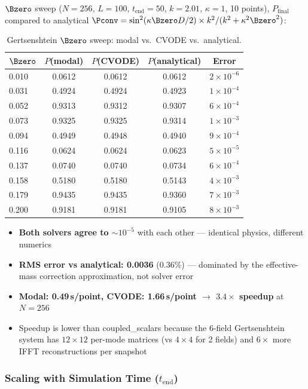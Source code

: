 $\Bzero$ sweep ($N=256$, $L=100$, $t_\text{end}=50$, $k=2.01$, $\kappa=1$, 10 points), $P_\text{final}$ compared to analytical $\Pconv = \sin^2(\kappa \Bzero D/2) \times k^2/(k^2 + \kappa^2 \Bzero^2)$:

\begin{table}[htbp]
\centering
\caption{Gertsenshtein $\Bzero$ sweep: modal vs.\ CVODE vs.\ analytical.}
\label{tab:modal-gertsenshtein}
\begin{tabular}{@{}lcccc@{}}
\toprule
$\Bzero$ & $P$(modal) & $P$(CVODE) & $P$(analytical) & Error \\
\midrule
0.010 & 0.0612 & 0.0612 & 0.0612 & $2\times 10^{-6}$ \\
0.031 & 0.4924 & 0.4924 & 0.4923 & $1\times 10^{-4}$ \\
0.052 & 0.9313 & 0.9312 & 0.9307 & $6\times 10^{-4}$ \\
0.073 & 0.9325 & 0.9325 & 0.9314 & $1\times 10^{-3}$ \\
0.094 & 0.4949 & 0.4948 & 0.4940 & $9\times 10^{-4}$ \\
0.116 & 0.0624 & 0.0624 & 0.0623 & $5\times 10^{-5}$ \\
0.137 & 0.0740 & 0.0740 & 0.0734 & $6\times 10^{-4}$ \\
0.158 & 0.5180 & 0.5180 & 0.5143 & $4\times 10^{-3}$ \\
0.179 & 0.9435 & 0.9435 & 0.9360 & $7\times 10^{-3}$ \\
0.200 & 0.9181 & 0.9181 & 0.9105 & $8\times 10^{-3}$ \\
\bottomrule
\end{tabular}
\end{table}

\begin{itemize}
  \item \textbf{Both solvers agree to ${\sim}10^{-5}$} with each other --- identical physics, different numerics
  \item \textbf{RMS error vs analytical: 0.0036} (0.36\%) --- dominated by the effective-mass correction approximation, not solver error
  \item \textbf{Modal: 0.49\,s/point, CVODE: 1.66\,s/point $\to$ $3.4\times$ speedup} at $N=256$
  \item Speedup is lower than coupled\_scalars because the 6-field Gertsenshtein system has $12\times 12$ per-mode matrices (vs $4\times 4$ for 2 fields) and $6\times$ more IFFT reconstructions per snapshot
\end{itemize}

\subsubsection{Scaling with Simulation Time ($t_\text{end}$)}
\label{sec:modal-scaling-tend}


